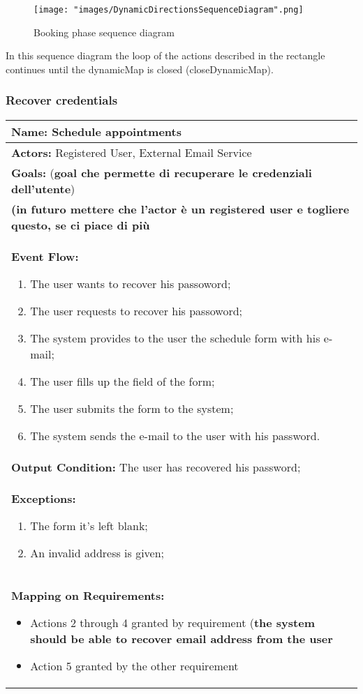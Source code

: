 \begin{figure}[H]
\begin{center}
\texttt{[image: "images/DynamicDirectionsSequenceDiagram".png]}
\caption{Booking phase sequence diagram}
\end{center}
\end{figure}

In this sequence diagram the loop of the actions described in the rectangle continues until the dynamicMap is closed (closeDynamicMap).

\subsubsection{Recover credentials}\label{usecase:recovercredentials}
\begin{longtable}{|p{14cm}|} \hline
\textbf{Name:} Schedule appointments \\ \hline
\textbf{Actors:} Registered User, External Email Service \\ \hline
\textbf{Goals:} (\textbf{goal che permette di recuperare le credenziali dell'utente})\\ \hline
\textbf{(\textbf{in futuro mettere che l'actor è un registered user e togliere questo, se ci piace di più}} \\ \hline

\textbf{Event Flow:}
\begin{enumerate}
\item The user wants to recover his passoword;
\item The user requests to recover his passoword;
\item The system provides to the user the schedule form with his e-mail;
\item The user fills up the field of the form;
\item The user submits the form to the system;
\item The system sends the e-mail to the user with his password.
\end{enumerate}
\\ \hline

\textbf{Output Condition:} The user has recovered his password; \\ \hline

\textbf{Exceptions:}
\begin{enumerate}
\item The form it's left blank;
\item An invalid address is given;
\end{enumerate} \\ \hline

\textbf{Mapping on Requirements:}
\begin{itemize}
\item Actions 2 through 4 granted by requirement (\textbf{the system should be able to recover email address from the user}
\item Action 5 granted by the other requirement
\end{itemize}  \\ \hline

\end{longtable}

